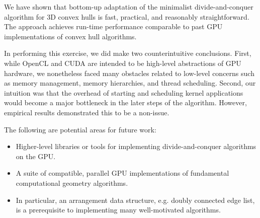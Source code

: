 \documentclass{article}
\begin{document}
We have shown that bottom-up adaptation of the minimalist divide-and-conquer algorithm for 3D convex hulls is fast, practical, and reasonably straightforward. The approach achieves run-time performance comparable to past GPU implementations of convex hull algorithms.

In performing this exercise, we did make two counterintuitive conclusions. First, while OpenCL and CUDA are intended to be high-level abstractions of GPU hardware, we nonetheless faced many obstacles related to low-level concerns such as memory management, memory hierarchies, and thread scheduling. Second, our intuition was that the overhead of starting and scheduling kernel applications would become a major bottleneck in the later steps of the algorithm.  However, empirical results demonstrated this to be a non-issue.

The following are potential areas for future work:
\begin{itemize}
\item Higher-level libraries or tools for implementing divide-and-conquer algorithms on the GPU.
\item A suite of compatible, parallel GPU implementations of fundamental computational geometry algorithms.
\item In particular, an arrangement data structure, e.g. doubly connected edge list, is a prerequisite to implementing many well-motivated algorithms.
\end{itemize}



\small 



\end{document}
